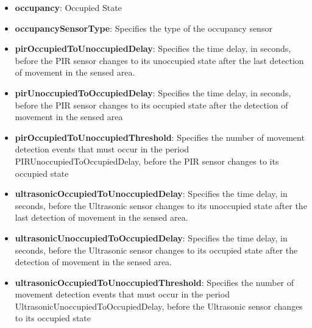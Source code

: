 \begin{itemize}
\item \textbf{occupancy}: Occupied State
\item \textbf{occupancySensorType}: Specifies the type of the occupancy sensor
\item \textbf{pirOccupiedToUnoccupiedDelay}: Specifies the time delay, in seconds, before the PIR sensor changes to its unoccupied state after the last detection of movement in the sensed area.
\item \textbf{pirUnoccupiedToOccupiedDelay}: Specifies the time delay, in seconds, before the PIR sensor changes to its occupied state after the detection of movement in the sensed area
\item \textbf{pirOccupiedToUnoccupiedThreshold}: Specifies the number of movement detection events that must occur in the period PIRUnoccupiedToOccupiedDelay, before the PIR sensor changes to its occupied state
\item \textbf{ultrasonicOccupiedToUnoccupiedDelay}: Specifies the time delay, in seconds, before the Ultrasonic sensor changes to its unoccupied state after the last detection of movement in the sensed area.
\item \textbf{ultrasonicUnoccupiedToOccupiedDelay}: Specifies the time delay, in seconds, before the Ultrasonic sensor changes to its occupied state after the detection of movement in the sensed area.
\item \textbf{ultrasonicOccupiedToUnoccupiedThreshold}: Specifies the number of movement detection events that must occur in the period UltrasonicUnoccupiedToOccupiedDelay, before the Ultrasonic sensor changes to its occupied state
\end{itemize}

